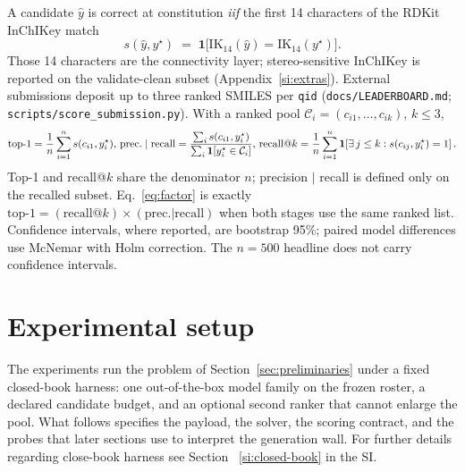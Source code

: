 \documentclass{article}
\begin{document}
A candidate $\hat y$ is correct at constitution \emph{iif} the first
14 characters of the RDKit InChIKey match
\begin{equation}
\label{eq:ik14}
s(\hat y, y^\star)
\;=\;
\mathbf{1}\!\big[\mathrm{IK}_{14}(\hat y)=\mathrm{IK}_{14}(y^\star)\big].
\end{equation}
Those 14 characters are the connectivity layer; stereo-sensitive InChIKey
is reported on the validate-clean subset (Appendix~\ref{si:extras}).
External submissions deposit up to three ranked SMILES per \texttt{qid}
(\texttt{docs/LEADERBOARD.md}; \texttt{scripts/score\_submission.py}).
With a ranked pool $\mathcal{C}_i=(c_{i1},\ldots,c_{ik})$, $k\leq 3$,
\begin{equation}
\label{eq:metrics}
\small
\mathrm{top\text{-}1}
= \frac{1}{n}\sum_{i=1}^n s(c_{i1},y_i^\star),
\,
\mathrm{prec.}\mid\mathrm{recall}
= \frac{\sum_i s(c_{i1},y_i^\star)}
       {\sum_i \mathbf{1}[y_i^\star\in\mathcal{C}_i]},
\,
\mathrm{recall}@k
= \frac{1}{n}\sum_{i=1}^n
\mathbf{1}\!\left[\exists\,j\le k:
s(c_{ij},y_i^\star)=1\right].
\end{equation}
Top-1 and recall@$k$ share the denominator $n$; precision $|$ recall is
defined only on the recalled subset.
Eq.~\ref{eq:factor} is exactly
$\mathrm{top\text{-}1}=(\mathrm{recall}@k)\times(\mathrm{prec.}|\mathrm{recall})$
when both stages use the same ranked list.
Confidence intervals, where reported, are bootstrap 95\%; paired model
differences use McNemar with Holm correction.
The $n{=}500$ headline does not carry confidence intervals.

\section{Experimental setup}
\label{sec:setup}
The experiments run the problem of Section~\ref{sec:preliminaries} under a
fixed closed-book harness: one out-of-the-box model family on the frozen
roster, a declared candidate budget, and an optional second ranker that
cannot enlarge the pool.
What follows specifies the payload, the solver, the scoring contract, and
the probes that later sections use to interpret the generation wall.
For further details regarding close-book harness see Section ~\ref{si:closed-book} in the SI. 
\end{document}
